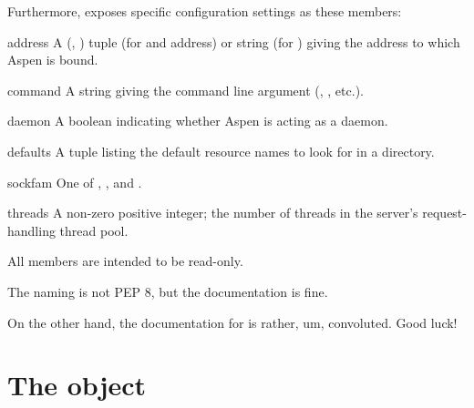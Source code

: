 Furthermore,  exposes specific configuration settings
as these members:

\begin{memberdesc}[]{address}
A (, ) tuple (for  and 
address) or string (for ) giving the address to which Aspen is
bound.
\end{memberdesc}

\begin{memberdesc}[string]{command}
A string giving the command line argument (, , etc.).
\end{memberdesc}

\begin{memberdesc}[boolean]{daemon}
A boolean indicating whether Aspen is acting as a daemon.
\end{memberdesc}

\begin{memberdesc}[tuple]{defaults}
A tuple listing the default resource names to look for in a directory.
\end{memberdesc}

\begin{memberdesc}[int]{sockfam}
One of , , and .
\end{memberdesc}

\begin{memberdesc}[int]{threads}
A non-zero positive integer; the number of threads in the server's
request-handling thread pool.
\end{memberdesc}


All members are intended to be read-only.


\begin{seealso}

{}{The naming is not PEP 8, but the documentation is fine.}

 {}{On
the other hand, the documentation for  is rather, um,
convoluted. Good luck!}

\end{seealso}


\section{The  object}
\label{api-conf}

